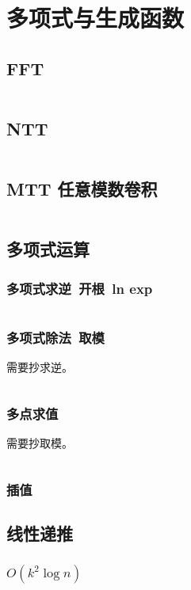 \section{多项式与生成函数}
				\subsection{FFT}
					\inputminted{cpp}{src/Math/FFT.cpp}
				\subsection{NTT}
					\inputminted{cpp}{src/Math/NTT.cpp}
				\subsection{MTT 任意模数卷积}
					\inputminted[highlightlines={24,27}]{cpp}{src/Math/MTT.cpp}
				\subsection{多项式运算}
					\subsubsection{多项式求逆\ 开根\ ln exp}
						\inputminted{cpp}{src/Math/多项式运算.cpp}
					\subsubsection{多项式除法\ 取模}
						需要抄求逆。
						\inputminted{cpp}{src/Math/多项式取模.cpp}
					\subsubsection{多点求值}
						需要抄取模。
						\inputminted{cpp}{src/Math/多点求值.cpp}
					\subsubsection{插值}
						
				\subsection{线性递推}
					\subsubsection*{$O(k^2 \log n)$}
						\inputminted{cpp}{src/Math/线性递推.cpp}
